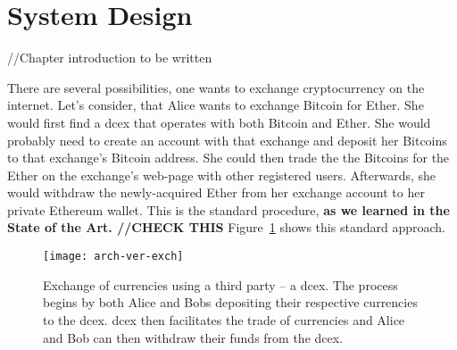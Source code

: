 \section{System Design}\label{sec:system-design}
% 
//Chapter introduction to be written

There are several possibilities, one wants to exchange cryptocurrency on the internet. Let's consider, that Alice wants to exchange Bitcoin for Ether. She would first find a \acrfull{dcex} that operates with both Bitcoin and Ether. She would probably need to create an account with that exchange and deposit her Bitcoins to that exchange's Bitcoin address. She could then trade the the Bitcoins for the Ether on the exchange's web-page with other registered users. Afterwards, she would withdraw the newly-acquired Ether from her exchange account to her private Ethereum wallet. This is the standard procedure, \textbf{as we learned in the State of the Art. //CHECK THIS} Figure~\ref{fig:arch-ver-exch} shows this standard approach.

\begin{figure}[ht]
    \centering
    \texttt{[image: arch-ver-exch]}
    \caption{Exchange of currencies using a third party -- a \acrfull{dcex}. The process begins by both Alice and Bobs depositing their respective currencies to the \acrshort{dcex}. \acrshort{dcex} then facilitates the trade of currencies and Alice and Bob can then withdraw their funds from the \acrshort{dcex}.}
    \label{fig:arch-ver-exch}
\end{figure}
% 


